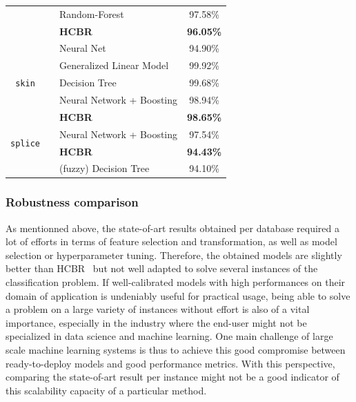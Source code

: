 \documentclass[preprint,12pt]{elsarticle}
\def\HCBR{{\sc HCBR}}
\def\bfHCBR{{\sc \bf HCBR}}
\theoremstyle{definition}
\begin{document}
\begin{table}[h!]
\begin{center}
\begin{small}
\begin{tabular}{|c|c|l|c|}
 &  \cite{7881507} & Random-Forest & 97.58\% \\ 
 & & {\bf \bfHCBR}& {\bf  96.05\%} \\
 & \cite{7727750} & Neural Net &  94.90\% \\\hline
 \multirow{3}{*}{\texttt{skin}} & \cite{basterrech2015generalized} & Generalized Linear Model & 99.92\% \\ 
 & \cite{6627823} & Decision Tree & 99.68\% \\ 
 & \cite{catak2017} & Neural Network + Boosting & 98.94\% \\
 & & {\bf \bfHCBR} & {\bf 98.65\%} \\ \hline
 \multirow{2}{*}{\texttt{splice}} & \cite{catak2017} & Neural Network + Boosting & 97.54\% \\
 & & {\bf \bfHCBR} & {\bf 94.43\%} \\
 & \cite{5409447} & (fuzzy) Decision Tree & 94.10\% \\ \hline
\end{tabular}
\end{small}
  \label{table:prev_results}
\end{center}
\end{table}

\subsubsection{Robustness comparison}

As mentionned above, the state-of-art results obtained per database required a lot of efforts in terms of feature selection and transformation, as well as model selection or hyperparameter tuning. Therefore, the obtained models are slightly better than \HCBR~ but not well adapted to solve several instances of the classification problem. If well-calibrated models with high performances on their domain of application is undeniably useful for practical usage, being able to solve a problem on a large variety of instances without effort is also of a vital importance, especially in the industry where the end-user might not be specialized in data science and machine learning. One main challenge of large scale machine learning systems is thus to achieve this good compromise between ready-to-deploy models and good performance metrics. With this perspective, comparing the state-of-art result per instance might not be a good indicator of this scalability capacity of a particular method. 
\end{document}
